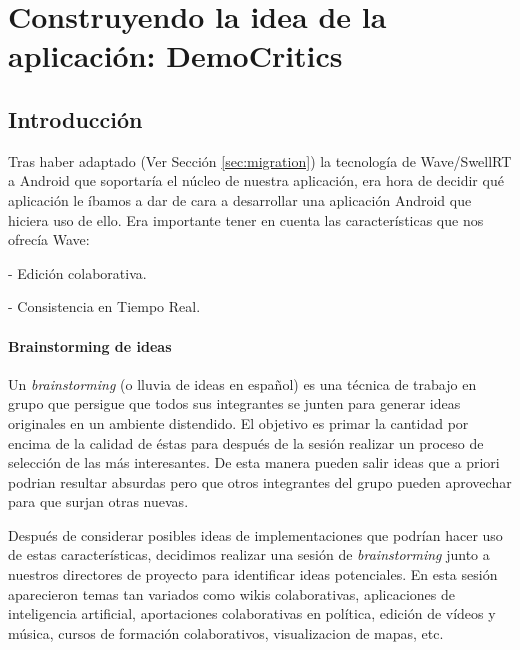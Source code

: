 \newpage
\thispagestyle{sectioned}
\chapter{Construyendo la idea de la aplicación: DemoCritics}

\section{Introducción}

Tras haber adaptado (Ver Sección \ref{sec:migration}) la tecnología de Wave/SwellRT a Android que soportaría el núcleo de nuestra aplicación, era hora de decidir qué aplicación le íbamos a dar de cara a desarrollar una aplicación Android que hiciera uso de ello. Era importante tener en cuenta las características que nos ofrecía Wave:

 - Edición colaborativa.

 - Consistencia en Tiempo Real.
 
\subsubsection{Brainstorming de ideas}

Un \textit{brainstorming} \cite{ref:bookBrainStorming} (o lluvia de ideas en español) es una técnica de trabajo en grupo que persigue que todos sus integrantes se junten para generar ideas originales en un ambiente distendido. El objetivo es primar la cantidad por encima de la calidad de éstas para después de la sesión realizar un proceso de selección de las más interesantes. De esta manera pueden salir ideas que a priori podrian resultar absurdas pero que otros integrantes del grupo pueden aprovechar para que surjan otras nuevas.  

Después de considerar posibles ideas de implementaciones que podrían hacer uso de estas características, decidimos realizar una sesión de \textit{brainstorming} junto a nuestros directores de proyecto para identificar ideas potenciales. En esta sesión aparecieron temas tan variados como wikis colaborativas, aplicaciones de inteligencia artificial, aportaciones colaborativas en política, edición de vídeos y música, cursos de formación colaborativos, visualizacion de mapas, etc.


